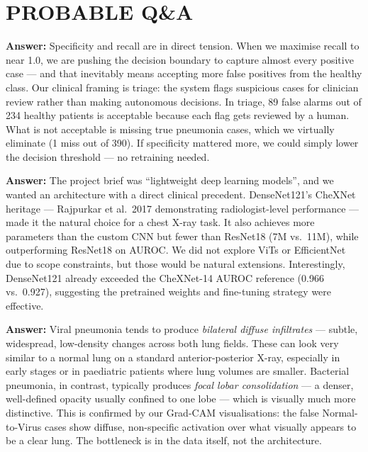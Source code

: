 \documentclass[12pt,a4paper]{article}
\begin{document}
\newpage
\section*{PROBABLE Q\&A}

\begin{tcolorbox}[qabox={Q1 — Why is specificity so low (0.62 for the ensemble)?}]
\textbf{Answer:} Specificity and recall are in direct tension. When we maximise recall to near 1.0, we are pushing the decision boundary to capture almost every positive case --- and that inevitably means accepting more false positives from the healthy class. Our clinical framing is triage: the system flags suspicious cases for clinician review rather than making autonomous decisions. In triage, 89 false alarms out of 234 healthy patients is acceptable because each flag gets reviewed by a human. What is not acceptable is missing true pneumonia cases, which we virtually eliminate (1 miss out of 390). If specificity mattered more, we could simply lower the decision threshold --- no retraining needed.
\end{tcolorbox}

\begin{tcolorbox}[qabox={Q2 — Why did you choose DenseNet121 as your primary model rather than a more recent architecture like EfficientNet or Vision Transformers?}]
\textbf{Answer:} The project brief was ``lightweight deep learning models'', and we wanted an architecture with a direct clinical precedent. DenseNet121's CheXNet heritage --- Rajpurkar et al.\ 2017 demonstrating radiologist-level performance --- made it the natural choice for a chest X-ray task. It also achieves more parameters than the custom CNN but fewer than ResNet18 (7M vs.\ 11M), while outperforming ResNet18 on AUROC. We did not explore ViTs or EfficientNet due to scope constraints, but those would be natural extensions. Interestingly, DenseNet121 already exceeded the CheXNet-14 AUROC reference (0.966 vs.\ 0.927), suggesting the pretrained weights and fine-tuning strategy were effective.
\end{tcolorbox}

\begin{tcolorbox}[qabox={Q3 — Why is Virus so much harder to classify than Bacteria?}]
\textbf{Answer:} Viral pneumonia tends to produce \emph{bilateral diffuse infiltrates} --- subtle, widespread, low-density changes across both lung fields. These can look very similar to a normal lung on a standard anterior-posterior X-ray, especially in early stages or in paediatric patients where lung volumes are smaller. Bacterial pneumonia, in contrast, typically produces \emph{focal lobar consolidation} --- a denser, well-defined opacity usually confined to one lobe --- which is visually much more distinctive. This is confirmed by our Grad-CAM visualisations: the false Normal-to-Virus cases show diffuse, non-specific activation over what visually appears to be a clear lung. The bottleneck is in the data itself, not the architecture.
\end{tcolorbox}
\end{document}
